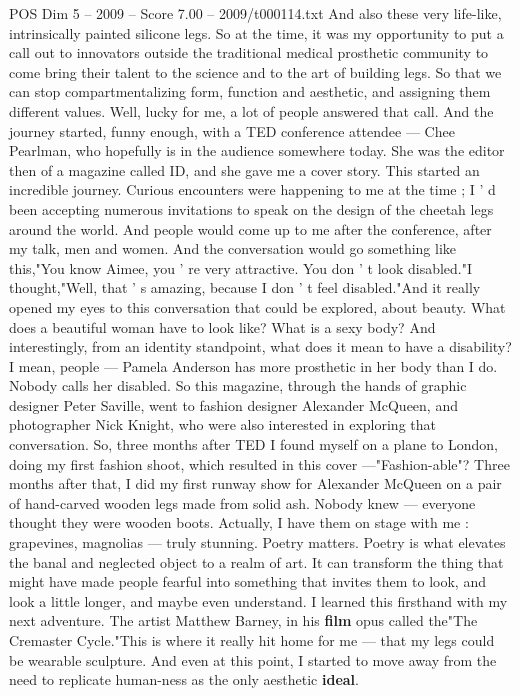 \begin{textsample}{POS Dim 5 – 2009 – Score 7.00 – 2009/t000114.txt}
And also these very life-like, intrinsically painted silicone legs.
So at the time, it was my opportunity to put a call out to innovators outside the traditional medical prosthetic community to come bring their talent to the science and to the art of building legs.
So that we can stop compartmentalizing form, function and aesthetic, and assigning them different values.
Well, lucky for me, a lot of people answered that call.
And the journey started, funny enough, with a TED conference attendee — Chee Pearlman, who hopefully is in the audience somewhere today.
She was the editor then of a magazine called ID, and she gave me a cover story.
This started an incredible journey.
Curious encounters were happening to me at the time ; I ' d been accepting numerous invitations to speak on the design of the cheetah legs around the world.
And people would come up to me after the conference, after my talk, men and women.
And the conversation would go something like this,"You know Aimee, you ' re very attractive.
You don ' t look disabled."I thought,"Well, that ' s amazing, because I don ' t feel disabled."And it really opened my eyes to this conversation that could be explored, about beauty.
What does a beautiful woman have to look like?
What is a sexy body?
And interestingly, from an identity standpoint, what does it mean to have a disability?
I mean, people — Pamela Anderson has more prosthetic in her body than I do.
Nobody calls her disabled.
So this magazine, through the hands of graphic designer Peter Saville, went to fashion designer Alexander McQueen, and photographer Nick Knight, who were also interested in exploring that conversation.
So, three months after TED I found myself on a plane to London, doing my first fashion shoot, which resulted in this cover —"Fashion-able"?
Three months after that, I did my first runway show for Alexander McQueen on a pair of hand-carved wooden legs made from solid ash.
Nobody knew — everyone thought they were wooden boots.
Actually, I have them on stage with me : grapevines, magnolias — truly stunning.
Poetry matters.
Poetry is what elevates the banal and neglected object to a realm of art.
It can transform the thing that might have made people fearful into something that invites them to look, and look a little longer, and maybe even understand.
I learned this firsthand with my next adventure.
The artist Matthew Barney, in his \textbf{film} opus called the"The Cremaster Cycle."This is where it really hit home for me — that my legs could be wearable sculpture.
And even at this point, I started to move away from the need to replicate human-ness as the only aesthetic \textbf{ideal}.

\end{textsample}
